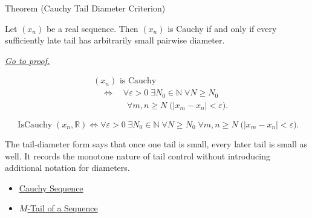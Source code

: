 
\begin{theorembox}{Theorem (Cauchy Tail Diameter Criterion)}
\begin{theorem}
\label{thm:cauchy-tail-diameter-criterion}
Let $(x_n)$ be a real sequence. Then $(x_n)$ is Cauchy if and only if
every sufficiently late tail has arbitrarily small pairwise diameter.

\smallskip
\noindent
\hyperref[prf:cauchy-tail-diameter-criterion]{\textit{Go to proof.}}
\end{theorem}
\end{theorembox}

\begin{remark*}
\[
\begin{aligned}
&(x_n)\text{ is Cauchy}\\
&\quad\Longleftrightarrow\quad
\forall \varepsilon>0\;\exists N_0\in\mathbb{N}\;\forall N\ge N_0\\
&\qquad\qquad
\forall m,n\ge N\;\bigl(|x_m-x_n|<\varepsilon\bigr).
\end{aligned}
\]
\end{remark*}

\begin{remark*}
\[
\operatorname{IsCauchy}(x_n,\mathbb{R})
\Longleftrightarrow
\forall \varepsilon>0\;\exists N_0\in\mathbb{N}\;\forall N\ge N_0\;\forall m,n\ge N
\;\bigl(|x_m-x_n|<\varepsilon\bigr).
\]
\end{remark*}

\begin{remark*}[Interpretation]
The tail-diameter form says that once one tail is small, every later tail is
small as well. It records the monotone nature of tail control without
introducing additional notation for diameters.
\end{remark*}

\begin{dependencies}
\begin{itemize}
  \item \hyperref[def:cauchy-sequence]{Cauchy Sequence}
  \item \hyperref[def:m-tail]{$M$-Tail of a Sequence}
\end{itemize}
\end{dependencies}

